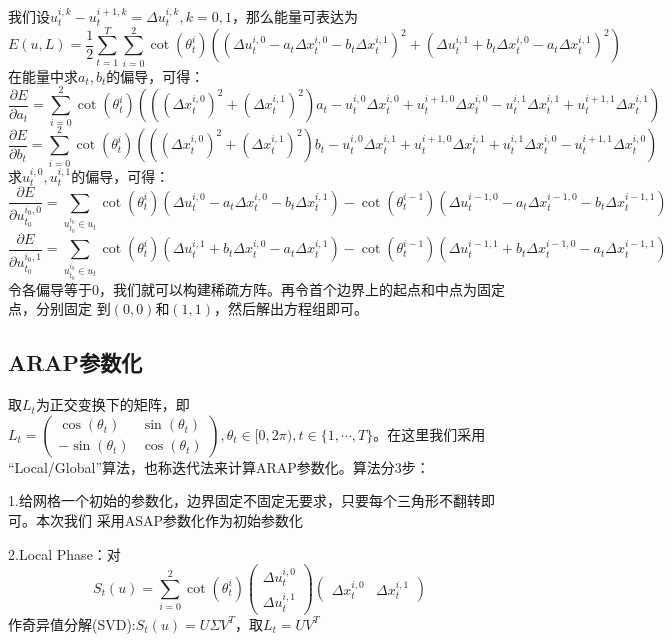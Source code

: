 \documentclass{article}
\begin{document}
	我们设$u_t^{i,k}-u_t^{i+1,k}=\Delta u_t^{i,k},k=0,1$，那么能量可表达为
	$$E(u,L)=\frac{1}{2}\sum_{t=1}^{T}\sum_{i=0}^{2}\cot{(\theta_t^i)}
	\left((\Delta u_t^{i,0}-a_t\Delta x_t^{i,0}-b_t\Delta x_t^{i,1})^2+
	(\Delta u_t^{i,1}+b_t\Delta x_t^{i,0}-a_t\Delta x_t^{i,1})^2\right)
	$$
	在能量中求$a_t,b_t$的偏导，可得：
	$$\frac{\partial{E}}{\partial{a_t}}=\sum_{i=0}^{2}\cot{(\theta_t^i)}
	\left(
	((\Delta x_t^{i,0})^2+(\Delta x_t^{i,1})^2)a_t-u_t^{i,0}\Delta x_t^{i,0}
	+u_t^{i+1,0}\Delta x_t^{i,0}-u_t^{i,1}\Delta x_t^{i,1}
	+u_t^{i+1,1}\Delta x_t^{i,1}
	\right)
	$$
	$$\frac{\partial{E}}{\partial{b_t}}=\sum_{i=0}^{2}\cot{(\theta_t^i)}
	\left(
	((\Delta x_t^{i,0})^2+(\Delta x_t^{i,1})^2)b_t-u_t^{i,0}\Delta x_t^{i,1}
	+u_t^{i+1,0}\Delta x_t^{i,1}+u_t^{i,1}\Delta x_t^{i,0}
	-u_t^{i+1,1}\Delta x_t^{i,0}
	\right)
	$$
	求$u_t^{i,0},u_t^{i,1}$的偏导，可得：
	$$\frac{\partial{E}}{\partial{u_{t_0}^{i_0,0}}}=\sum_{u_{t_0}^{i_0}\in u_t}
	\cot{(\theta_t^i)}(\Delta u_t^{i,0}-a_t\Delta x_t^{i,0}-b_t\Delta x_t^{i,1})
	-\cot{(\theta_t^{i-1})}(\Delta u_t^{i-1,0}-a_t\Delta x_t^{i-1,0}-b_t\Delta 
	x_t^{i-1,1})
	$$
	$$\frac{\partial{E}}{\partial{u_{t_0}^{i_0,1}}}=\sum_{u_{t_0}^{i_0}\in u_t}
	\cot{(\theta_t^i)}(\Delta u_t^{i,1}+b_t\Delta x_t^{i,0}-a_t\Delta x_t^{i,1})
	-\cot{(\theta_t^{i-1})}(\Delta u_t^{i-1,1}+b_t\Delta x_t^{i-1,0}-a_t\Delta 
	x_t^{i-1,1})
	$$
	令各偏导等于0，我们就可以构建稀疏方阵。再令首个边界上的起点和中点为固定点，分别固定
	到$(0,0)$和$(1,1)$，然后解出方程组即可。
	\subsection{ARAP参数化}
	取$L_t$为正交变换下的矩阵，即
	$L_t=\begin{pmatrix}   
		\cos{(\theta_t)}&\sin{(\theta_t)}\\-\sin{(\theta_t)}&\cos{(\theta_t)}
	\end{pmatrix},\theta_t\in[0,2\pi),t\in\{1,\cdots,T\}$。在这里我们采用
	“Local/Global”算法，也称迭代法来计算ARAP参数化。算法分3步：
	
	1.给网格一个初始的参数化，边界固定不固定无要求，只要每个三角形不翻转即可。本次我们
	采用ASAP参数化作为初始参数化
	
	2.Local Phase：对
	$$S_t(u)=\sum_{i=0}^{2}\cot{(\theta_t^i)}
	\begin{pmatrix}\Delta u_t^{i,0}\\\Delta u_t^{i,1}\end{pmatrix}
	\begin{pmatrix}\Delta x_t^{i,0}&\Delta x_t^{i,1}\end{pmatrix}
	$$
	作奇异值分解(SVD):$S_t(u)=U\Sigma V^T$，取$L_t=UV^T$
\end{document}
